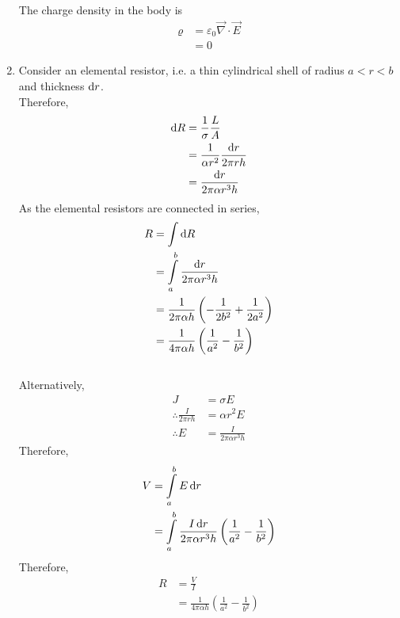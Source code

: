 \documentclass[fleqn, a4paper, 12pt, twoside]{article}
\theoremstyle{definition}
\theoremstyle{theorem}
\begin{document}
\begin{solution}
\begin{enumerate}[leftmargin = *]
			The charge density in the body is
			\begin{align*}
				\varrho &= \varepsilon_0 \overrightarrow{\nabla} \cdot \overrightarrow{E}\\
				&= 0
			\end{align*}
		\item
			Consider an elemental resistor, i.e. a thin cylindrical shell of radius $a < r < b$ and thickness $\dif r$.\\
			Therefore,
			\begin{align*}
				\dif R & = \frac{1}{\sigma} \frac{L}{A}                  \\
                                       & = \frac{1}{\alpha r^2} \frac{\dif r}{2 \pi r h} \\
                                       & = \frac{\dif r}{2 \pi \alpha r^3 h}
			\end{align*}
			As the elemental resistors are connected in series,
			\begin{align*}
				R & = \int \dif R                                                                \\
                                  & = \int\limits_{a}^{b} \frac{\dif r}{2 \pi \alpha r^3 h}                      \\
                                  & = \frac{1}{2 \pi \alpha h} \left( -\frac{1}{2 b^2} + \frac{1}{2 a^2} \right) \\
                                  & = \frac{1}{4 \pi \alpha h} \left( \frac{1}{a^2} - \frac{1}{b^2} \right)
			\end{align*}
			~\\
			Alternatively,
			\begin{align*}
				J &= \sigma E\\
				\therefore \frac{I}{2 \pi r h} &= \alpha r^2 E\\
				\therefore E &= \frac{I}{2 \pi \alpha r^3 h}
			\end{align*}
			Therefore,
			\begin{align*}
				V &= \int\limits_{a}^{b} E \dif r\\
				&= \int\limits_{a}^{b} \frac{I \dif r}{2 \pi \alpha r^3 h} \left( \frac{1}{a^2} - \frac{1}{b^2} \right)
			\end{align*}
			Therefore,
			\begin{align*}
				R &= \frac{V}{I}\\
				&= \frac{1}{4 \pi \alpha h} \left( \frac{1}{a^2} - \frac{1}{b^2} \right)
			\end{align*}

\end{enumerate}
\end{solution}
\end{document}
